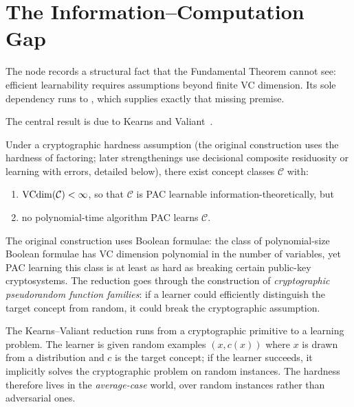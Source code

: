 \section{The Information--Computation Gap}
\label{sec:gap}

\begin{graphnode}[title={Graph Node: \nde{computational\_hardness}}]
The node  records a structural fact that the
Fundamental Theorem cannot see: efficient learnability requires assumptions
beyond finite VC dimension.  Its sole dependency runs to
, which supplies exactly that missing premise.
\end{graphnode}

The central result is due to Kearns and Valiant~\cite{KearnsValiant1994}.

\begin{thm}
\label{thm:kearns-valiant}
Under a cryptographic hardness assumption (the original construction uses the
hardness of factoring; later strengthenings use decisional composite
residuosity or learning with errors, detailed below), there exist concept
classes $\mathcal{C}$ with:
\begin{enumerate}[leftmargin=*,nosep]
\item $\mathrm{VCdim}(\mathcal{C}) < \infty$, so that $\mathcal{C}$ is PAC learnable
  information-theoretically, but
\item no polynomial-time algorithm PAC learns $\mathcal{C}$.
\end{enumerate}
\end{thm}

The original construction uses Boolean formulae: the class of polynomial-size
Boolean formulae has VC dimension polynomial in the number of variables, yet
PAC learning this class is at least as hard as breaking certain public-key
cryptosystems.  The reduction goes through the construction of
\emph{cryptographic pseudorandom function families}: if a learner could
efficiently distinguish the target concept from random, it could break the
cryptographic assumption.

\begin{remark}
\label{rmk:kv-reduction}
The Kearns--Valiant reduction runs from a cryptographic primitive to a learning
problem.  The learner is given random examples
$(x, c(x))$ where $x$ is drawn from a distribution and $c$ is the target
concept; if the learner succeeds, it implicitly solves the cryptographic
problem on random instances.  The hardness therefore lives in the
\emph{average-case} world, over random instances rather than adversarial ones.
\end{remark}


